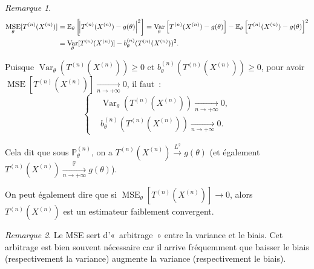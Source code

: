\documentclass{report}
\DeclareMathOperator{\Var}{Var}
\DeclareMathOperator{\MSE}{MSE}
\renewcommand{\P}{\mathbb P}
\newcommand{\E}{\mathbb E}
\newcommand{\pinfty}{{+\infty}}
\newcommand{\cvgp}{\xrightarrow[n \to \pinfty]{\P}}
\newcommand{\Xn}{{X^{(n)}}}
\newcommand{\Tn}{{T^{(n)}}}
\newcommand{\TnXn}{{\Tn(\Xn)}}
\theoremstyle{definition}
\theoremstyle{remark}
\newtheorem*{rmq}{Remarque}
\begin{document}
			\begin{rmq}
			\begin{align*}
				\MSE_\theta[\TnXn] &= \E_\theta\left[\abs {\TnXn - g(\theta)}^2\right]
					= \Var_\theta\left[\TnXn - g(\theta)\right] - \E_\theta\left[\TnXn - g(\theta)\right]^2 \\
				&= \Var_\theta[\TnXn] - b_\theta^{(n)}(\TnXn)^2.
			\end{align*}

			Puisque $\Var_\theta(\TnXn) \geq 0$ et $b_\theta^{(n)}(\TnXn) \geq 0$, pour avoir $\MSE[\TnXn] \xrightarrow[n \to \pinfty]{} 0$, il faut~:
			\[\begin{cases}&\Var_\theta(\TnXn) \xrightarrow[n \to \pinfty]{} 0, \\&b_\theta^{(n)}(\TnXn) \xrightarrow[n \to \pinfty]{} 0.\end{cases}\]

			Cela dit que sous $\P_\theta^{(n)}$, on a $\TnXn \xrightarrow{L^2} g(\theta)$ (et également $\TnXn \cvgp g(\theta)$).

			On peut également dire que si $\MSE_\theta[\TnXn] \to 0$, alors $\TnXn$ est un estimateur faiblement convergent.
			\end{rmq}

			\begin{rmq} Le MSE sert d'«~arbitrage~» entre la variance et le biais. Cet arbitrage est bien souvent nécessaire car il arrive fréquemment que baisser
			le biais (respectivement la variance) augmente la variance (respectivement le biais).
			\end{rmq}
\end{document}
